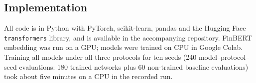 \subsection{Implementation}
All code is in Python with PyTorch, scikit-learn, pandas and the Hugging Face \texttt{transformers} library, and is available in the accompanying repository. FinBERT embedding was run on a GPU; models were trained on CPU in Google Colab. Training all models under all three protocols for ten seeds (240 model--protocol--seed evaluations: 180 trained networks plus 60 non-trained baseline evaluations) took about five minutes on a CPU in the recorded run.

